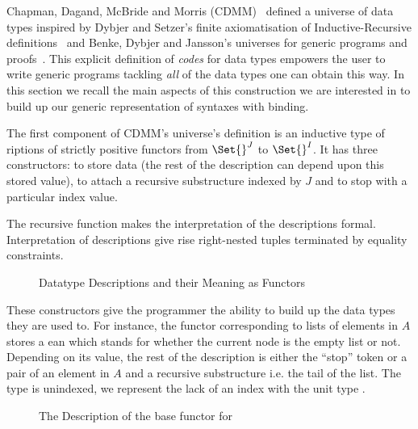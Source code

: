 Chapman, Dagand, McBride and Morris (CDMM)~\citeyear{Chapman:2010:GAL:1863543.1863547}
defined a universe of data types inspired by Dybjer and Setzer's
finite axiomatisation of Inductive-Recursive definitions~\citeyear{Dybjer1999}
and Benke, Dybjer and Jansson's universes for generic programs and proofs~\citeyear{benke-ugpp}.
This explicit definition of \emph{codes} for data types empowers the
user to write generic programs tackling \emph{all} of the data types
one can obtain this way. In this section we recall the main aspects
of this construction we are interested in to build up our generic
representation of syntaxes with binding.

The first component of CDMM's universe's definition is an inductive type
of riptions of strictly positive functors from $\Set{}^J$ to
$\Set{}^I$. It has three constructors:  to store data (the rest of
the description can depend upon this stored value),  to attach a
recursive substructure indexed by $J$ and  to stop with a particular
index value.

The recursive function  makes the interpretation of the
descriptions formal. Interpretation of descriptions give rise right-nested tuples
terminated by equality constraints.

\begin{figure}[h]
\begin{minipage}{0.45\textwidth}
\end{minipage}\hfill
\begin{minipage}{0.45\textwidth}
\end{minipage}
\caption{Datatype Descriptions and their Meaning as Functors}\label{figure:desc}
\end{figure}

These constructors give the programmer the ability to build up the data
types they are used to. For instance, the functor corresponding
to lists of elements in $A$ stores a ean which stands for whether
the current node is the empty list or not. Depending on its value, the
rest of the description is either the ``stop'' token or a pair of an element
in $A$ and a recursive substructure i.e. the tail of the list. The  type
is unindexed, we represent the lack of an index with the unit type \AD{$\top$}.

\begin{figure}[h]
\caption{The Description of the base functor for  }\label{figure:listD}
\end{figure}

